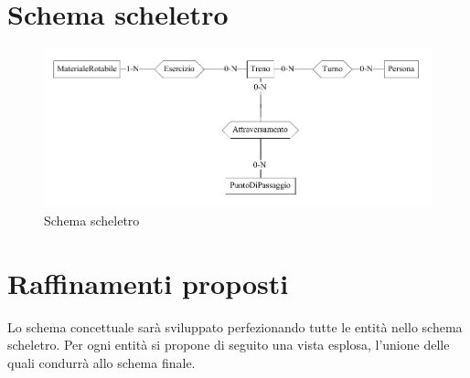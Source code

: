 \documentclass[a4paper,12pt]{report}
\begin{document}
	\section{Schema scheletro}
	\begin{figure}[h]
		\includegraphics[width=\linewidth]{res/schema/skel}
		\caption{Schema scheletro}
	\end{figure}
	\section{Raffinamenti proposti}
	\par Lo schema concettuale sarà sviluppato perfezionando tutte le entità nello schema scheletro. Per ogni entità si propone di seguito una vista esplosa, l'unione delle quali condurrà allo schema finale.
\end{document}
